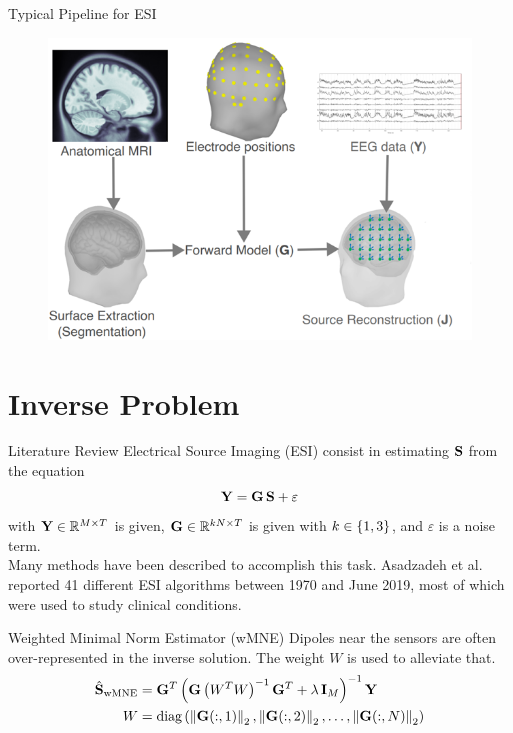 \documentclass[progressbar=head]{beamer}
\begin{document}
\begin{frame}{Typical Pipeline for ESI}
\begin{figure}
\centering
\includegraphics[width=0.7\linewidth]{./img_dev/pipeline}
\end{figure}
\end{frame}


{
\section{Inverse Problem}
}

\begin{frame}{Literature Review}
Electrical Source Imaging (ESI) consist in estimating $\mathbf{S}$ from the equation
\begin{equation}
\mathbf{Y} = \mathbf{G}\, \mathbf{S} + \varepsilon
\end{equation}
with $\mathbf{Y}\in \mathbb{R}^{M\times T}$ is given, $\mathbf{G}\in \mathbb{R}^{kN\times T}$ is given with $k\in \left\{ 1,3 \right\}$, and $\varepsilon$ is a noise term.\\

Many methods have been described to accomplish this task.
%
Asadzadeh et al. reported 41 different ESI algorithms between 1970 and June 2019, most of which were used to study clinical conditions.
\end{frame}

\begin{frame}{Weighted Minimal Norm Estimator (wMNE)}
Dipoles near the sensors are often over-represented in the inverse solution. The weight $W$ is used to alleviate that.
\begin{align}
\hat{\mathbf{S}}_\text{wMNE} 
&=
\mathbf{G}^T
\left( \mathbf{G} \left( W^T W \right)^{-1} \mathbf{G}^T + \lambda\, \mathbf{I}_M \right)^{-1} \mathbf{Y}
\\
W &=
\text{diag}\left(   \left\lVert \mathbf{G}(:,1) \right\rVert_2, \left\lVert \mathbf{G}(:,2) \right\rVert_2, \dots, \left\lVert \mathbf{G}(:,N) \right\rVert_2   \right)
\end{align}
\end{frame}
\end{document}
